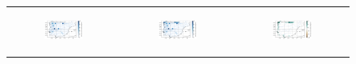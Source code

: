 \begin{figure}[htbp]
    \centering
    \begin{tabular}{ccc}
        \begin{subfigure}[b]{0.33\textwidth}
            \caption{}
            \includegraphics[width=\linewidth]{images/eval_halfdeg/maps/slowr_subgrid.png}
        \end{subfigure} &
        \begin{subfigure}[b]{0.33\textwidth}
            \caption{}
            \includegraphics[width=\linewidth]{images/eval_halfdeg/maps/slowr_interp.png}
        \end{subfigure} &
        \begin{subfigure}[b]{0.33\textwidth}
            \caption{}
            \includegraphics[width=\linewidth]{images/eval_halfdeg/maps/slowr_diff.png}
        \end{subfigure} \\
        

\end{tabular}
\end{figure}
